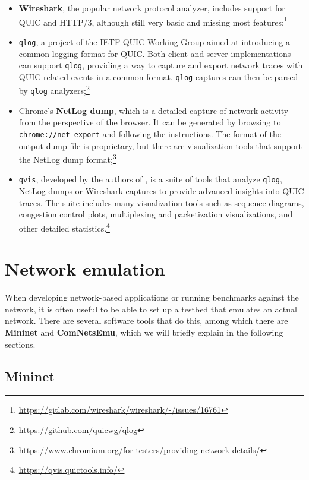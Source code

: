 \begin{itemize}
    \item \textbf{Wireshark}, the popular network protocol analyzer, includes support for QUIC and HTTP/3, although still very basic and missing most features;\footnote{\url{https://gitlab.com/wireshark/wireshark/-/issues/16761}}
    \item \texttt{qlog}, a project of the IETF QUIC Working Group aimed at introducing a common logging format for QUIC. Both client and server implementations can support \texttt{qlog}, providing a way to capture and export network traces with QUIC-related events in a common format. \texttt{qlog} captures can then be parsed by \texttt{qlog} analyzers;\footnote{\url{https://github.com/quicwg/qlog}}
    \item Chrome's \textbf{NetLog dump}, which is a detailed capture of network activity from the perspective of the browser. It can be generated by browsing to \texttt{chrome://net-export} and following the instructions. The format of the output dump file is proprietary, but there are visualization tools that support the NetLog dump format;\footnote{\url{https://www.chromium.org/for-testers/providing-network-details/}}
    \item \texttt{qvis}, developed by the authors of \cite{quicdiversity}, is a suite of tools that analyze \texttt{qlog}, NetLog dumps or Wireshark captures to provide advanced insights into QUIC traces. The suite includes many visualization tools such as sequence diagrams, congestion control plots, multiplexing and packetization visualizations, and other detailed statistics.\footnote{\url{https://qvis.quictools.info/}}
\end{itemize}

\section{Network emulation}
\label{sec:bg/network}

When developing network-based applications or running benchmarks against the network, it is often useful to be able to set up a testbed that emulates an actual network. There are several software tools that do this, among which there are \textbf{Mininet} and \textbf{ComNetsEmu}, which we will briefly explain in the following sections.

\subsection{Mininet}
\label{sec:bg/network/mininet}

